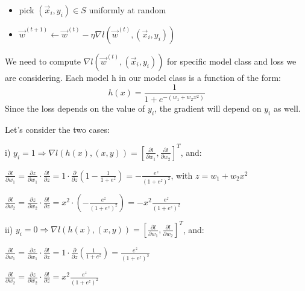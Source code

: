 \documentclass[a4paper,11pt,oneside]{book}
\begin{document}
\begin{enumerate}
\begin{solution}
            \begin{itemize}
            \item pick $(\vec{x}_i, y_i) \in S$ uniformly at random
            \item $\vec{w}^{(t+1)} \leftarrow \vec{w}^{(t)} - \eta \nabla l(\vec{w}^{(t)}, (\vec{x}_i,y_i))$
            \end{itemize}
            
            We need to compute $\nabla l(\vec{w}^{(t)}, (\vec{x}_i,y_i))$ for specific model class and loss we are considering. Each model h in our model class is a function of the form:
            $$h(x) = \frac{1}{1+e^{-(w_1+w_2x^2)}}$$
            Since the loss depends on the value of $y_i$, the gradient will depend on $y_i$ as well.
            
            Let's consider the two cases:
            
            i) $y_i = 1 \Rightarrow \nabla l(h(x),(x,y)) = \left[\frac{\partial l}{\partial w_1}, \frac{\partial l}{\partial w_2}\right]^T$, and:
            
            $\frac{\partial l}{\partial w_1} = \frac{\partial z}{\partial w_1} \cdot \frac{\partial l}{\partial z} = 1 \cdot \frac{\partial}{\partial z}(1-\frac{1}{1+e^z}) = -\frac{e^z}{(1+e^z)^2}$, with $z=w_1+w_2x^2$
            
            $\frac{\partial l}{\partial w_2} = \frac{\partial z}{\partial w_2} \cdot \frac{\partial l}{\partial z} = x^2 \cdot (-\frac{e^z}{(1+e^z)^2}) = -x^2\frac{e^z}{(1+e^z)^2}$
            
            ii) $y_i = 0 \Rightarrow \nabla l(h(x),(x,y)) = \left[\frac{\partial l}{\partial w_1}, \frac{\partial l}{\partial w_2}\right]^T$, and:
            
            $\frac{\partial l}{\partial w_1} = \frac{\partial z}{\partial w_1} \cdot \frac{\partial l}{\partial z} = 1 \cdot \frac{\partial}{\partial z}(\frac{1}{1+e^z}) = \frac{e^z}{(1+e^z)^2}$
            
            $\frac{\partial l}{\partial w_2} = \frac{\partial z}{\partial w_2} \cdot \frac{\partial l}{\partial z} = x^2\frac{e^z}{(1+e^z)^2}$
            

\end{solution}
\end{enumerate}
\end{document}
